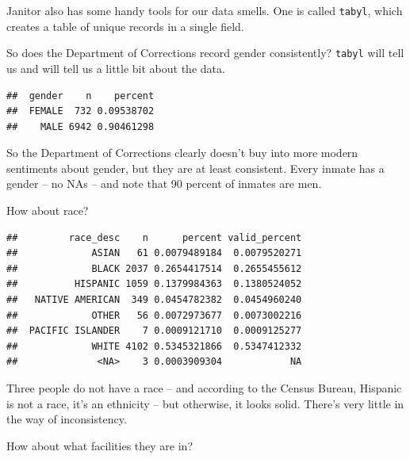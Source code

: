 \documentclass[]{book}
\newenvironment{Shaded}{\begin{snugshade}}{\end{snugshade}}
\newcommand{\KeywordTok}[1]{\textcolor[rgb]{0.13,0.29,0.53}{\textbf{#1}}}
\newcommand{\NormalTok}[1]{#1}
\newcommand{\OperatorTok}[1]{\textcolor[rgb]{0.81,0.36,0.00}{\textbf{#1}}}
\newcommand{\StringTok}[1]{\textcolor[rgb]{0.31,0.60,0.02}{#1}}
\begin{document}
Janitor also has some handy tools for our data smells. One is called \texttt{tabyl}, which creates a table of unique records in a single field.

So does the Department of Corrections record gender consistently? \texttt{tabyl} will tell us and will tell us a little bit about the data.

\begin{Shaded}
\end{Shaded}

\begin{verbatim}
##  gender    n    percent
##  FEMALE  732 0.09538702
##    MALE 6942 0.90461298
\end{verbatim}

So the Department of Corrections clearly doesn't buy into more modern sentiments about gender, but they are at least consistent. Every inmate has a gender -- no NAs -- and note that 90 percent of inmates are men.

How about race?

\begin{Shaded}
\end{Shaded}

\begin{verbatim}
##         race_desc    n      percent valid_percent
##             ASIAN   61 0.0079489184  0.0079520271
##             BLACK 2037 0.2654417514  0.2655455612
##          HISPANIC 1059 0.1379984363  0.1380524052
##   NATIVE AMERICAN  349 0.0454782382  0.0454960240
##             OTHER   56 0.0072973677  0.0073002216
##  PACIFIC ISLANDER    7 0.0009121710  0.0009125277
##             WHITE 4102 0.5345321866  0.5347412332
##              <NA>    3 0.0003909304            NA
\end{verbatim}

Three people do not have a race -- and according to the Census Bureau, Hispanic is not a race, it's an ethnicity -- but otherwise, it looks solid. There's very little in the way of inconsistency.

How about what facilities they are in?
\end{document}
